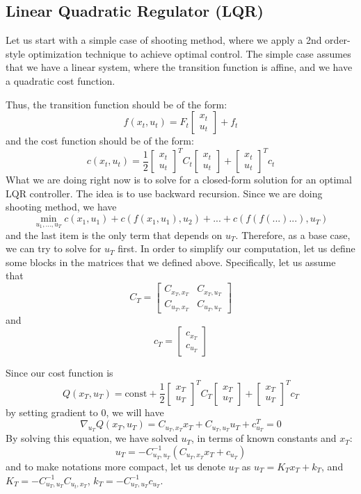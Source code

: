 \subsection{Linear Quadratic Regulator (LQR)}
Let us start with a simple case of shooting method, where we apply a 2nd order-style optimization technique to achieve optimal control. The simple case assumes that we have a linear system, where the transition function is affine, and we have a quadratic cost function. 

Thus, the transition function should be of the form:
\[
f(x_t,u_t) = F_t \begin{bmatrix} x_t\\u_t\end{bmatrix}+f_t
\]
and the cost function should be of the form:
\[
c(x_t,u_t) = \frac{1}{2}\begin{bmatrix}x_t\\u_t\end{bmatrix}^TC_t\begin{bmatrix}x_t\\u_t\end{bmatrix}+\begin{bmatrix}x_t\\u_t\end{bmatrix}^Tc_t
\]
What we are doing right now is to solve for a closed-form solution for an optimal LQR controller. The idea is to use backward recursion. Since we are doing shooting method, we have $$\min_{u_1,...,u_T}c(x_1,u_1) + c(f(x_1,u_1),u_2)+...+c(f(f(...)...),u_T)$$
and the last item is the only term that depends on $u_T$. Therefore, as a base case, we can try to solve for $u_T$ first. In order to simplify our computation, let us define some blocks in the matrices that we defined above. Specifically, let us assume that
\[
C_T = \begin{bmatrix} C_{x_T,x_T}& C_{x_T,u_T}\\C_{u_T,x_T}&C_{u_T,u_T}\end{bmatrix}
\]
and
\[
c_T=\begin{bmatrix}c_{x_T}\\c_{u_T}\end{bmatrix}
\]

Since our cost function is
\[
Q(x_T,u_T) = \mathrm{const} + \frac{1}{2}\begin{bmatrix}x_T\\u_T\end{bmatrix}^TC_T\begin{bmatrix}x_T\\u_T\end{bmatrix}+\begin{bmatrix}x_T\\u_T\end{bmatrix}^Tc_T
\]
by setting gradient to 0, we will have 
\[
\nabla_{u_T}Q(x_T,u_T) = C_{u_T,x_T}x_T+C_{u_T,u_T}u_T+c_{u_T}^T=0
\]
By solving this equation, we have solved $u_T$, in terms of known constants and $x_T$:
\[
u_T = -C_{u_T,u_T}^{-1}(C_{u_T,x_T}x_T+c_{u_T})
\]
and to make notations more compact, let us denote $u_T$ as $u_T = K_Tx_T+k_T$, and $K_T = -C_{u_T,u_T}^{-1}C_{u_t,x_T}$, $k_T = -C_{u_T,u_T}^{-1}c_{u_T}$.

